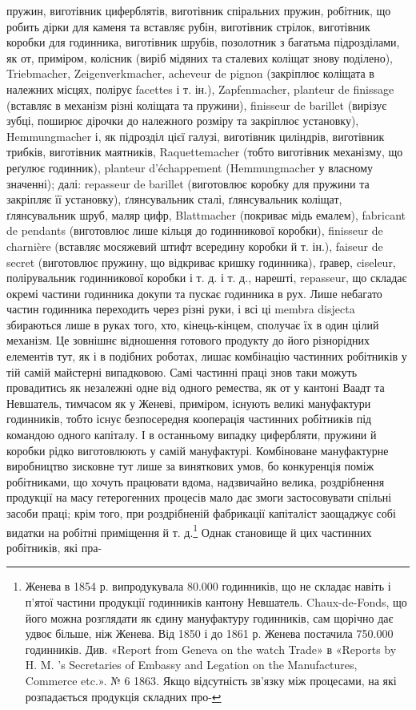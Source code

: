 пружин, виготівник циферблятів, виготівник спіральних пружин,
робітник, що робить дірки для каменя та вставляє рубін, виготівник
стрілок, виготівник коробки для годинника, виготівник
шрубів, позолотник з багатьма підрозділами, як от, приміром,
колісник (виріб мідяних та сталевих коліщат знову поділено),
Triebmacher, Zeigenverkmacher, acheveur de pignon (закріплює
коліщата в належних місцях, полірує facettes і т. ін.), Zapfenmacher,
planteur de finissage (вставляє в механізм різні коліщата
та пружини), finisseur de barillet (вирізує зубці, поширює дірочки
до належного розміру та закріплює установку), Hemmungmacher
і, як підрозділ цієї галузі, виготівник циліндрів, виготівник
трибків, виготівник маятників, Raquettemacher (тобто виготівник
механізму, що реґулює годинник), planteur d’échappement
(Hemmungmacher у власному значенні); далі: repasseur de barillet
(виготовлює коробку для пружини та закріпляє її установку),
ґлянсувальник сталі, ґлянсувальник коліщат, ґлянсувальник
шруб, маляр цифр, Blattmacher (покриває мідь емалем),
fabricant de pendants (виготовлює лише кільця до годинникової
коробки), finisseur de charnière (вставляє мосяжевий штифт
всередину коробки й т. ін.), faiseur de secret (виготовлює пружину,
що відкриває кришку годинника), ґравер, ciseleur, полірувальник
годинникової коробки і т. д. і т. д., нарешті, repasseur, що
складає окремі частини годинника докупи та пускає годинника
в рух. Лише небагато частин годинника переходить через різні
руки, і всі ці membra disjecta збираються лише в руках того,
хто, кінець-кінцем, сполучає їх в один цілий механізм. Це
зовнішнє відношення готового продукту до його різнорідних
елементів тут, як і в подібних роботах, лишає комбінацію частинних
робітників у тій самій майстерні випадковою. Самі
частинні праці знов таки можуть провадитись як незалежні
одне від одного ремества, як от у кантоні Ваадт та Невшатель,
тимчасом як у Женеві, приміром, існують великі мануфактури
годинників, тобто існує безпосередня кооперація частинних робітників
під командою одного капіталу. І в останньому випадку
цифербляти, пружини й коробки рідко виготовлюють у самій
мануфактурі. Комбіноване мануфактурне виробництво зисковне
тут лише за виняткових умов, бо конкуренція поміж робітниками,
що хочуть працювати вдома, надзвичайно велика, роздрібнення
продукції на масу гетерогенних процесів мало дає змоги застосовувати
спільні засоби праці; крім того, при роздрібненій фабрикації
капіталіст заощаджує собі видатки на робітні приміщення
й т. д.\footnote{
Женева в 1854 р. випродукувала 80.000 годинників, що не складає
навіть і п’ятої частини продукції годинників кантону Невшатель.
Chaux-de-Fonds, що його можна розглядати як єдину мануфактуру годинників,
сам щорічно дає удвоє більше, ніж Женева. Від 1850 і до 1861 р.
Женева постачила 750.000 годинників. Див. «Report from Geneva on
the watch Trade» в «Reports by H. M. ’s Secretaries of Embassy and Legation
on the Manufactures, Commerce etc.». № 6 1863. Якщо відсутність
зв’язку між процесами, на які розпадається продукція складних про-
} Однак становище й цих частинних робітників, які пра-